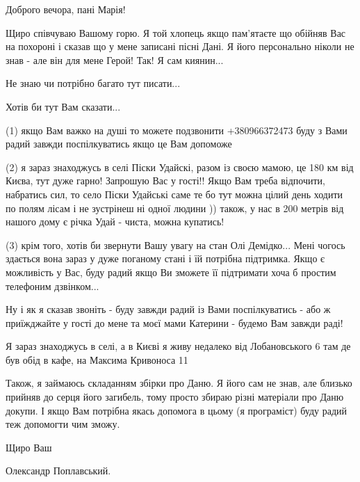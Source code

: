  
 
 
 
 

Доброго вечора, пані Марія!

Щиро співчуваю Вашому горю. Я той хлопець якщо
пам'ятаєте що обійняв Вас на похороні і сказав що у мене
записані пісні Дані. Я його персонально ніколи не знав - але він для мене Герой!
Так! Я сам киянин...

Не знаю чи потрібно багато тут писати...

Хотів би тут Вам сказати...

(1) якщо Вам важко на душі то можете подзвонити +380966372473 
буду з Вами радий завжди поспілкуватись якщо це Вам допоможе

(2) я зараз знаходжусь в селі Піски Удайскі, разом із своєю мамою, це 180 км від Києва, тут дуже гарно!
Запрошую Вас у гості!! Якщо Вам треба відпочити, набратись сил, то село Піски Удайські саме те бо тут можна цілий день ходити
по полям лісам і не зустрінеш ні одної людини )) також, у нас в 200 метрів від нашого дому є річка Удай - чиста, можна купатись!

(3) крім того, хотів би звернути Вашу увагу на стан Олі Демідко... Мені чогось здається вона зараз у дуже поганому
стані і їй потрібна підтримка. 
Якщо є можливість у Вас, буду радий якщо Ви зможете її підтримати хоча б простим телефоним дзвінком...

Ну і як я сказав звоніть - буду завжди радий із Вами поспілкуватись - або ж
приїжджайте у гості до мене та моєї мами Катерини - будемо Вам завжди раді!

Я зараз знаходжусь в селі, а в Києві я живу недалеко від Лобановського 6 там де був обід в кафе, на Максима Кривоноса 11

Також, я займаюсь складанням збірки про Даню. Я його сам не знав, але близько прийняв 
до серця його загибель, тому просто збираю різні матеріали про Даню докупи. І якщо Вам потрібна якась допомога в цьому
(я програміст) буду радий теж допомогти чим зможу.

Щиро Ваш

Олександр Поплавський.

